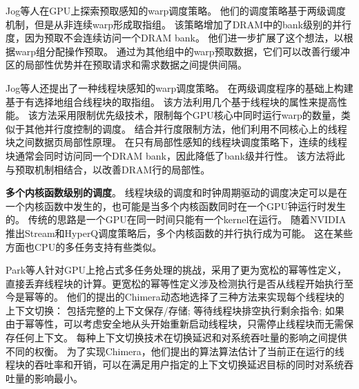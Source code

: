 Jog等人在GPU上探索预取感知的warp调度策略。
他们的调度策略基于两级调度机制，但是从非连续warp形成取指组。 
该策略增加了DRAM中的bank级别的并行度，因为预取不会连续访问一个DRAM bank。 
他们进一步扩展了这个想法，以根据warp组分配操作预取。 
通过为其他组中的warp预取数据，它们可以改善行缓冲区的局部性优势并在预取请求和需求数据之间提供间隔。

Jog等人还提出了一种线程块感知的warp调度策略。
在两级调度程序的基础上构建基于有选择地组合线程块的取指组。
该方法利用几个基于线程块的属性来提高性能。 
该方法采用限制优先级技术，限制每个GPU核心中同时运行warp的数量，类似于其他并行度控制的调度。 
结合并行度限制方法，他们利用不同核心上的线程块之间数据页局部性原理。 
在只有局部性感知的线程块调度策略下，连续的线程块通常会同时访问同一个DRAM bank，因此降低了bank级并行性。 
该方法将此与预取机制相结合，以改善DRAM行的局部性。


\textbf{多个内核函数级别的调度}。
线程块级的调度和时钟周期驱动的调度决定可以是在一个内核函数中发生的，也可能是当多个内核函数同时在一个GPU钟运行时发生的。
传统的思路是一个GPU在同一时间只能有一个kernel在运行。
随着NVIDIA推出Stream和HyperQ调度策略后，多个内核函数的并行执行成为可能。
这在某些方面也CPU的多任务支持有些类似。

Park等人针对GPU上抢占式多任务处理的挑战，采用了更为宽松的幂等性定义，直接丢弃线程块的计算。更宽松的幂等性定义涉及检测执行是否从线程开始执行至今是幂等的。
他们的提出的Chimera动态地选择了三种方法来实现每个线程块的上下文切换：
包括完整的上下文保存/存储;
等待线程块排空执行剩余指令;
如果由于幂等性，可以考虑安全地从头开始重新启动线程块，只需停止线程块而无需保存任何上下文。
每种上下文切换技术在切换延迟和对系统吞吐量的影响之间提供不同的权衡。
为了实现Chimera，他们提出的算法算法估计了当前正在运行的线程块的吞吐率和开销，可以在满足用户指定的上下文切换延迟目标的同时对系统吞吐量的影响最小。







